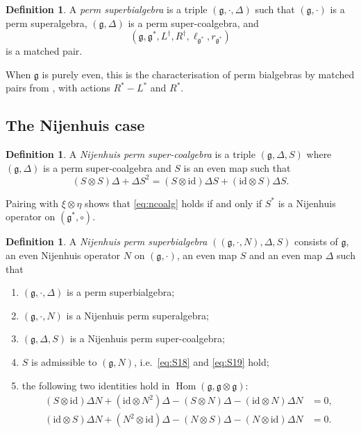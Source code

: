 \documentclass[11pt]{article}
\theoremstyle{definition}
\newtheorem{definition}[theorem]{Definition}
\newcommand{\g}{\mathfrak{g}}
\newcommand{\id}{\mathrm{id}}
\begin{document}
\begin{definition}\label{def:bialg}
A \emph{perm superbialgebra} is a triple $(\g,\cdot,\Delta)$ such that $(\g,\cdot)$ is a perm superalgebra, $(\g,\Delta)$ is a perm super-coalgebra, and
\[
(\g,\g^*,L^\dagger,R^\dagger,\ell_{\g^*},r_{\g^*})
\]
is a matched pair.
\end{definition}

When $\g$ is purely even, this is the characterisation of perm bialgebras by matched pairs from \cite{Hou}, with actions $R^*-L^*$ and $R^*$.

\subsection{The Nijenhuis case}

\begin{definition}\label{def:ncoalgebra}
A \emph{Nijenhuis perm super-coalgebra} is a triple $(\g,\Delta,S)$ where $(\g,\Delta)$ is a perm super-coalgebra and $S$ is an even map such that
\begin{equation}\label{eq:ncoalg}
(S\otimes S)\Delta+\Delta S^2
=(S\otimes\id)\Delta S+(\id\otimes S)\Delta S.
\end{equation}
\end{definition}

Pairing with $\xi\otimes\eta$ shows that \eqref{eq:ncoalg} holds if and only if $S^*$ is a Nijenhuis operator on $(\g^*,\circ)$.

\begin{definition}\label{def:Nbialg}
A \emph{Nijenhuis perm superbialgebra} $((\g,\cdot,N),\Delta,S)$ consists of $\g$, an even Nijenhuis operator $N$ on $(\g,\cdot)$, an even map $S$ and an even map $\Delta$ such that
\begin{enumerate}[label=(\arabic*),itemsep=0pt]
\item $(\g,\cdot,\Delta)$ is a perm superbialgebra;
\item $(\g,\cdot,N)$ is a Nijenhuis perm superalgebra;
\item $(\g,\Delta,S)$ is a Nijenhuis perm super-coalgebra;
\item $S$ is admissible to $(\g,N)$, i.e.\ \eqref{eq:S18} and \eqref{eq:S19} hold;
\item the following two identities hold in $\operatorname{Hom}(\g,\g\otimes\g)$:
\begin{align}
(S\otimes\id)\Delta N+(\id\otimes N^2)\Delta
-(S\otimes N)\Delta-(\id\otimes N)\Delta N&=0,\label{eq:c30}\\
(\id\otimes S)\Delta N+(N^2\otimes\id)\Delta
-(N\otimes S)\Delta-(N\otimes\id)\Delta N&=0.\label{eq:c31}
\end{align}
\end{enumerate}
\end{definition}
\end{document}
